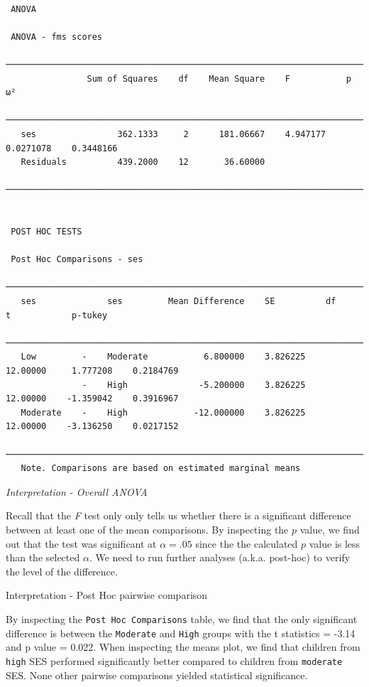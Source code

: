 \documentclass[
]{article}
\begin{document}
\begin{verbatim}

 ANOVA

 ANOVA - fms scores                                                                         
 ────────────────────────────────────────────────────────────────────────────────────────── 
                Sum of Squares    df    Mean Square    F           p            ω²          
 ────────────────────────────────────────────────────────────────────────────────────────── 
   ses                362.1333     2      181.06667    4.947177    0.0271078    0.3448166   
   Residuals          439.2000    12       36.60000                                         
 ────────────────────────────────────────────────────────────────────────────────────────── 


 POST HOC TESTS

 Post Hoc Comparisons - ses                                                                         
 ────────────────────────────────────────────────────────────────────────────────────────────────── 
   ses              ses         Mean Difference    SE          df          t            p-tukey     
 ────────────────────────────────────────────────────────────────────────────────────────────────── 
   Low         -    Moderate           6.800000    3.826225    12.00000     1.777208    0.2184769   
               -    High              -5.200000    3.826225    12.00000    -1.359042    0.3916967   
   Moderate    -    High             -12.000000    3.826225    12.00000    -3.136250    0.0217152   
 ────────────────────────────────────────────────────────────────────────────────────────────────── 
   Note. Comparisons are based on estimated marginal means
\end{verbatim}

\emph{Interpretation - Overall ANOVA}

Recall that the \emph{F} test only only tells us whether there is a significant difference between at least one of the mean comparisons. By inspecting the \(p\) value, we find out that the test was significant at \(\alpha = .05\) since the the calculated \(p\) value is less than the selected \(\alpha\). We need to run further analyses (a.k.a. post-hoc) to verify the level of the difference.

Interpretation - Post Hoc pairwise comparison

By inspecting the \texttt{Post\ Hoc\ Comparisons} table, we find that the only significant difference is between the \texttt{Moderate} and \texttt{High} groups with the t statistics = -3.14 and p value = 0.022. When inspecting the means plot, we find that children from \texttt{high} SES performed significantly better compared to children from \texttt{moderate} SES. None other pairwise comparisons yielded statistical significance.
\end{document}
